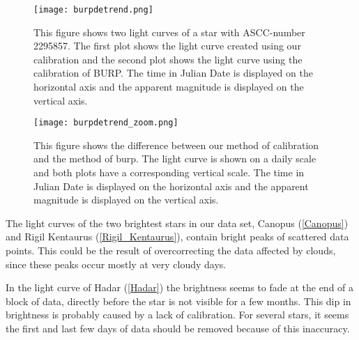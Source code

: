 \documentclass{aa}
\begin{document}
\begin{figure}
    \centering
    \texttt{[image: burpdetrend.png]}
    \caption{This figure shows two light curves of a star with ASCC-number 2295857. The first plot shows the light curve created using our calibration and the second plot shows the light curve using the calibration of BURP. The time in Julian Date is displayed on the horizontal axis and the apparent magnitude is displayed on the vertical axis.}
    
    \label{burp}
\end{figure}
\begin{figure}
    \centering
    \texttt{[image: burpdetrend\_zoom.png]}
    \caption{This figure shows the difference between our method of calibration and the method of burp. The light curve is shown on a daily scale and both plots have a corresponding vertical scale. The time in Julian Date is displayed on the horizontal axis and the apparent magnitude is displayed on the vertical axis.}
    \label{burpzoom}
\end{figure}

The light curves of the two brightest stars in our data set, Canopus (\ref{Canopus}) and Rigil Kentaurus (\ref{Rigil_Kentaurus}), contain bright peaks of scattered data points. This could be the result of overcorrecting the data affected by clouds, since these peaks occur mostly at very cloudy days.

In the light curve of Hadar (\ref{Hadar}) the brightness seems to fade at the end of a block of data, directly before the star is not visible for a few months. This dip in brightness is probably caused by a lack of calibration. For several stars, it seems the first and last few days of data should be removed because of this inaccuracy.
\end{document}
